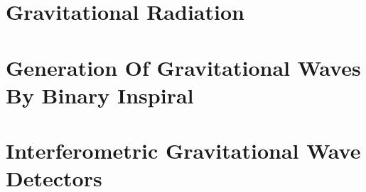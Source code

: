 
\section{Gravitational Radiation}

\section{Generation Of Gravitational Waves By Binary Inspiral}

\section{Interferometric Gravitational Wave Detectors}

